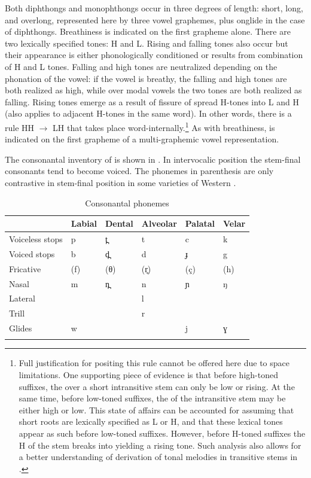 \documentclass[output=paper,newtxmath,modfonts,nonflat]{langsci/langscibook}
\begin{document}
Both diphthongs and monophthongs occur in three degrees of length: short, long, and overlong, represented here by three vowel graphemes, plus onglide in the case of diphthongs. Breathiness is indicated on the first grapheme alone. There are two lexically specified tones: H and L. Rising and falling tones also occur but their appearance is either phonologically conditioned or results from combination of H and L tones. Falling and high tones are neutralized depending on the phonation of the vowel: if the vowel is breathy, the falling and high tones are both realized as high, while over modal vowels the two tones are both realized as falling. Rising tones emerge as a result of fissure of spread H-tones into L and H (also applies to adjacent H-tones in the same word). In other words, there is a rule HH $\rightarrow$ LH that takes place word-internally.\footnote{Full justification for positing this rule cannot be offered here due to space limitations. One supporting piece of evidence is that before high-toned suffixes, the  over a short intransitive stem can only be low or rising. At the same time, before low-toned suffixes, the  of the intransitive stem may be either high or low. This state of affairs can be accounted for assuming that short roots are lexically specified as L or H, and that these lexical tones appear as such before low-toned suffixes. However, before H-toned suffixes the H of the stem breaks into yielding a rising tone. Such analysis also allows for a better understanding of derivation of tonal melodies in transitive stems in .} As with breathiness,  is indicated on the first grapheme of a multi-graphemic vowel representation.

The consonantal inventory of  is shown in . In intervocalic position the stem-final consonants tend to become voiced. The phonemes in parenthesis are only contrastive in stem-final position in some varieties of Western .

\begin{table}
\begin{tabularx}{\textwidth}{XXXXXX}
\lsptoprule
& \bfseries Labial & \bfseries Dental & \bfseries Alveolar & \bfseries Palatal & \bfseries Velar\\
\midrule 
Voiceless stops & p & t̪ & t & c & k\\
Voiced stops & b & d̪ & d & ɟ & g\\
Fricative & (f) & (θ) & (r̥) & (ç) & (h)\\
Nasal & m & n̪ & n & ɲ & ŋ\\
Lateral &  &  & l &  & \\
Trill &  &  & r &  & \\
Glides & w &  &  & j & ɣ\\
\lspbottomrule
\end{tabularx}
\caption{Consonantal phonemes}
\label{tab:monich:2}
\end{table}
\end{document}
